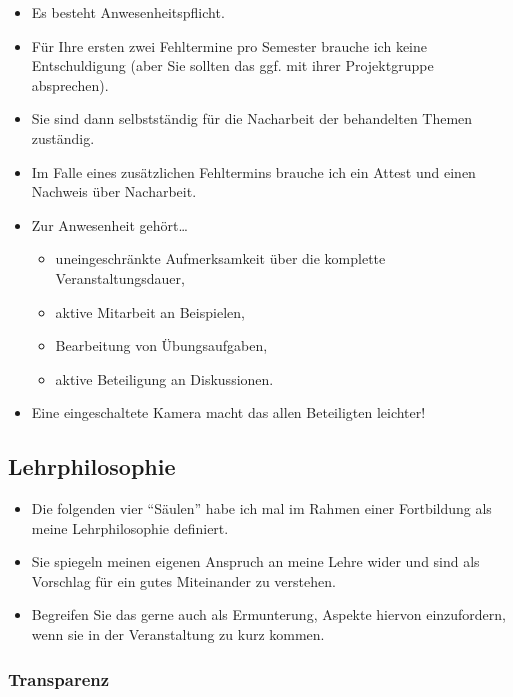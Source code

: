 \documentclass[11pt,german,a4paper]{article}
\providecommand{\tightlist}{%
  \setlength{\itemsep}{0pt}\setlength{\parskip}{0pt}}
\begin{document}
\begin{itemize}
\tightlist
\item
  Es besteht Anwesenheitspflicht.
\item
  Für Ihre ersten zwei Fehltermine pro Semester brauche ich keine Entschuldigung (aber Sie sollten das ggf. mit ihrer Projektgruppe absprechen).
\item
  Sie sind dann selbstständig für die Nacharbeit der behandelten Themen zuständig.
\item
  Im Falle eines zusätzlichen Fehltermins brauche ich ein Attest und einen Nachweis über Nacharbeit.
\item
  Zur Anwesenheit gehört\ldots{}

  \begin{itemize}
  \tightlist
  \item
    uneingeschränkte Aufmerksamkeit über die komplette Veranstaltungsdauer,
  \item
    aktive Mitarbeit an Beispielen,
  \item
    Bearbeitung von Übungsaufgaben,
  \item
    aktive Beteiligung an Diskussionen.
  \end{itemize}
\item
  Eine eingeschaltete Kamera macht das allen Beteiligten leichter!
\end{itemize}

\hypertarget{lehrphilosophie}{%
\subsection{Lehrphilosophie}\label{lehrphilosophie}}

\begin{itemize}
\tightlist
\item
  Die folgenden vier ``Säulen'' habe ich mal im Rahmen einer Fortbildung als meine Lehrphilosophie definiert.
\item
  Sie spiegeln meinen eigenen Anspruch an meine Lehre wider und sind als Vorschlag für ein gutes Miteinander zu verstehen.
\item
  Begreifen Sie das gerne auch als Ermunterung, Aspekte hiervon einzufordern, wenn sie in der Veranstaltung zu kurz kommen.
\end{itemize}

\hypertarget{transparenz}{%
\subsubsection{Transparenz}\label{transparenz}}
\end{document}

